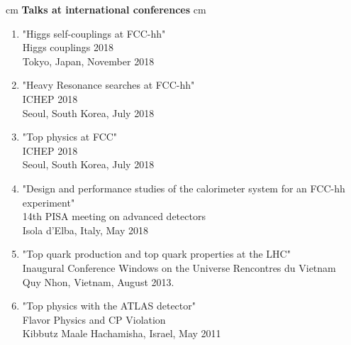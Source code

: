 \documentclass[12pt]{article}
\begin{document}
 cm
{\bf  \large  Talks at international conferences}
 cm
\begin{enumerate} 

\item "Higgs self-couplings at FCC-hh"\\
Higgs couplings 2018\\
Tokyo, Japan, November 2018

\item "Heavy Resonance searches at FCC-hh"\\
ICHEP 2018\\
Seoul, South Korea, July 2018

\item "Top physics at FCC"\\
ICHEP 2018\\
Seoul, South Korea, July 2018

\item "Design and performance studies of the calorimeter system for an FCC-hh experiment"\\
14th PISA meeting on advanced detectors\\
Isola d'Elba, Italy, May 2018

\item "Top quark production and top quark properties at the LHC"\\
Inaugural Conference Windows on the Universe Rencontres du Vietnam \\
Quy Nhon, Vietnam, August 2013.

\item "Top physics with the ATLAS detector"\\
Flavor Physics and CP Violation\\ 
Kibbutz Maale Hachamisha, Israel, May 2011

\end{enumerate}
\end{document}
